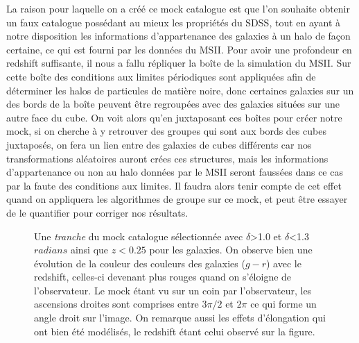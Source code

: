 La raison pour laquelle on a créé ce mock catalogue est que l'on souhaite obtenir un faux catalogue possédant au mieux les
propriétés du SDSS, tout en ayant à notre disposition les informations d'appartenance des galaxies à un halo de façon certaine, ce
qui est fourni par les données du MSII. Pour avoir une profondeur en redshift suffisante, il nous a fallu répliquer la boîte de la
simulation du MSII. Sur cette boîte des conditions aux limites périodiques sont appliquées afin de déterminer les halos de
particules de matière noire, donc certaines galaxies sur un des bords de la boîte peuvent être regroupées avec des galaxies situées
sur une autre face du cube. On voit alors qu'en juxtaposant ces boîtes pour créer notre mock, si on cherche à y retrouver des
groupes qui sont aux bords des cubes juxtaposés, on fera un lien entre des galaxies de cubes différents car nos transformations
aléatoires auront crées ces structures, mais les informations d'appartenance ou non au halo données par le MSII seront faussées
dans ce cas par la faute des conditions aux limites. Il faudra alors tenir compte de cet effet quand on appliquera les algorithmes
de groupe sur ce mock, et peut être essayer de le quantifier pour corriger nos résultats.
\begin{figure}[htb]
	\centering
	\caption{\footnotesize{}Une \emph{tranche} du mock catalogue sélectionnée avec $\delta$>\num{1.0} et $\delta$<\num{1.3}
	$radians$ ainsi que $z<0.25$ pour les galaxies. On observe bien une évolution de la couleur des couleurs des galaxies
	($g-r$) avec le redshift, celles-ci devenant plus rouges quand on s'éloigne de l'observateur. Le mock étant vu sur un coin
	par l'observateur, les ascensions droites sont comprises entre $3\pi/2$ et $2\pi$ ce qui forme un angle droit sur l'image.
	On remarque aussi les effets d'élongation qui ont bien été modélisés, le redshift étant celui observé sur la figure.}
	\label{fig:mocktr}
\end{figure}

